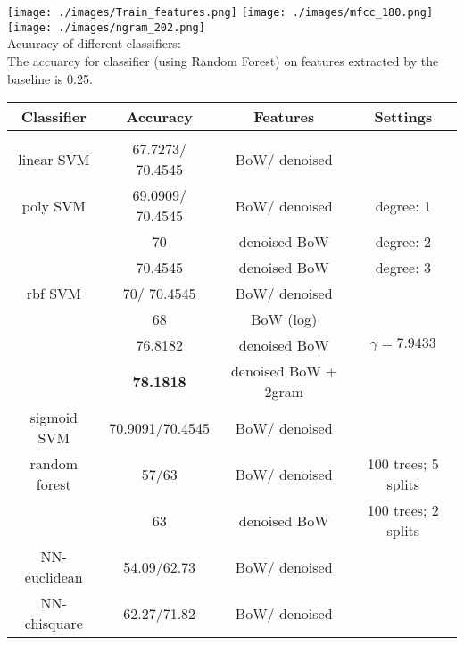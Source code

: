 \footnotesize
\texttt{[image: ./images/Train\_features.png]}
\texttt{[image: ./images/mfcc\_180.png]}
\texttt{[image: ./images/ngram\_202.png]}\\
\footnotesize
Acuuracy of different classifiers: \\
The accuarcy for classifier (using Random Forest) on features extracted by the baseline is 0.25. 


\begin{tabular}{cccc}
\multicolumn{1}{c}{\bf Classifier }&\multicolumn{1}{c}{\bf Accuracy}  &\multicolumn{1}{c}{\bf Features} &\multicolumn{1}{c}{\bf Settings}
\\ \hline \\
linear SVM		&67.7273/ 70.4545 		&BoW/ denoised 		&  \\
poly SVM		&69.0909/ 70.4545  	&BoW/ denoised  	& degree: 1  \\
			& 70 			& denoised BoW 	& degree: 2  \\
			& 70.4545  	& denoised BoW 	& degree: 3  \\
rbf SVM       	&70/ 	70.4545  	&BoW/ denoised 		&  \\
                     	&68  			&  BoW (log) 	&  \\
          		&76.8182  		&  denoised BoW 	&  $\gamma = 7.9433$ \\
          		&{\bf 78.1818}  	&  denoised BoW + 2gram 	&    \\
sigmoid SVM     	&70.9091/70.4545	&BoW/ denoised 		&  \\
random forest    	&57/63 			& BoW/ denoised 	& 100 trees; 5 splits \\
       			&63  			& denoised BoW 	& 100 trees; 2 splits \\
NN-euclidean   	&54.09/62.73		& BoW/ denoised 	&  \\
NN-chisquare	&62.27/71.82		& BoW/ denoised 	&  \\

\end{tabular}


